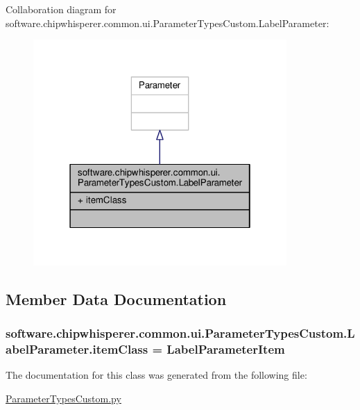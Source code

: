 Collaboration diagram for software.\+chipwhisperer.\+common.\+ui.\+Parameter\+Types\+Custom.\+Label\+Parameter\+:\nopagebreak
\begin{figure}[H]
\begin{center}
\leavevmode
\includegraphics[width=274pt]{df/def/classsoftware_1_1chipwhisperer_1_1common_1_1ui_1_1ParameterTypesCustom_1_1LabelParameter__coll__graph}
\end{center}
\end{figure}


\subsection{Member Data Documentation}
\hypertarget{classsoftware_1_1chipwhisperer_1_1common_1_1ui_1_1ParameterTypesCustom_1_1LabelParameter_ab94fd0ed23f05be7f03731bbb7d6446b}{}
\subsubsection[{item\+Class}]{\setlength{\rightskip}{0pt plus 5cm}software.\+chipwhisperer.\+common.\+ui.\+Parameter\+Types\+Custom.\+Label\+Parameter.\+item\+Class = {\bf Label\+Parameter\+Item}\hspace{0.3cm}{\ttfamily [static]}}\label{classsoftware_1_1chipwhisperer_1_1common_1_1ui_1_1ParameterTypesCustom_1_1LabelParameter_ab94fd0ed23f05be7f03731bbb7d6446b}


The documentation for this class was generated from the following file\+:\begin{DoxyCompactItemize}
\item 
\hyperlink{ParameterTypesCustom_8py}{Parameter\+Types\+Custom.\+py}\end{DoxyCompactItemize}

